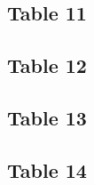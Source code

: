 \documentclass{article}
\begin{document}
\subsection{Table 11}

\subsection{Table 12}

\subsection{Table 13}

\subsection{Table 14}
\end{document}
